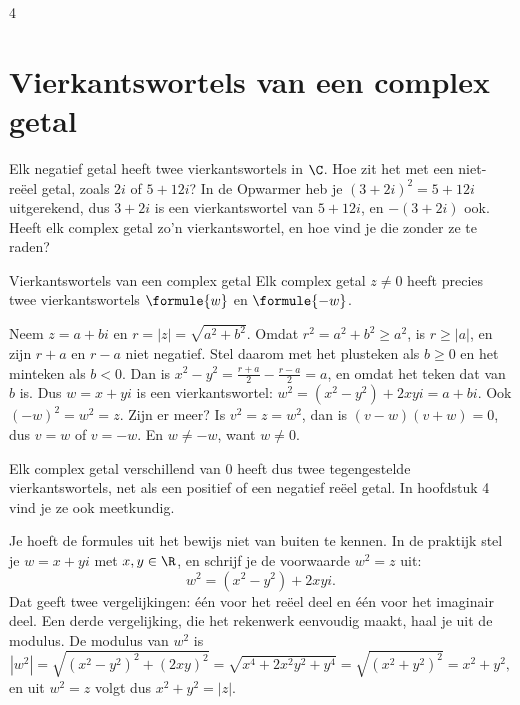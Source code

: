 \begin{alleenvoor}{4}
\section{Vierkantswortels van een complex getal}

Elk negatief getal heeft twee vierkantswortels in $\C$. Hoe zit het met een niet-reëel getal, zoals $2i$ of $5 + 12i$? In de Opwarmer heb je $(3 + 2i)^2 = 5 + 12i$ uitgerekend, dus $3 + 2i$ is een vierkantswortel van $5 + 12i$, en $-(3 + 2i)$ ook. Heeft elk complex getal zo'n vierkantswortel, en hoe vind je die zonder ze te raden?

\begin{theorie}
\begin{stelling}{Vierkantswortels van een complex getal}
Elk complex getal $z \neq 0$ heeft precies twee vierkantswortels $\formule{w}$ en $\formule{-w}$.
\end{stelling}

\begin{bewijs}
Neem $z = a + bi$ en $r = |z| = \sqrt{a^2 + b^2}$. Omdat $r^2 = a^2 + b^2 \geqslant a^2$, is $r \geqslant |a|$, en zijn $r + a$ en $r - a$ niet negatief. Stel daarom
met het plusteken als $b \geqslant 0$ en het minteken als $b < 0$. Dan is $x^2 - y^2 = \frac{r + a}{2} - \frac{r - a}{2} = a$, en
omdat het teken dat van $b$ is. Dus $w = x + yi$ is een vierkantswortel: $w^2 = (x^2 - y^2) + 2xyi = a + bi$. Ook $(-w)^2 = w^2 = z$. Zijn er meer? Is $v^2 = z = w^2$, dan is $(v - w)(v + w) = 0$, dus $v = w$ of $v = -w$. En $w \neq -w$, want $w \neq 0$.
\end{bewijs}
\end{theorie}

Elk complex getal verschillend van 0 heeft dus twee tegengestelde vierkantswortels, net als een positief of een negatief reëel getal. In hoofdstuk 4 vind je ze ook meetkundig.

Je hoeft de formules uit het bewijs niet van buiten te kennen. In de praktijk stel je $w = x + yi$ met $x, y \in \R$, en schrijf je de voorwaarde $w^2 = z$ uit:
\[ w^2 = (x^2 - y^2) + 2xyi . \]
Dat geeft twee vergelijkingen: één voor het reëel deel en één voor het imaginair deel. Een derde vergelijking, die het rekenwerk eenvoudig maakt, haal je uit de modulus. De modulus van $w^2$ is
\[ |w^2| = \sqrt{(x^2 - y^2)^2 + (2xy)^2} = \sqrt{x^4 + 2x^2y^2 + y^4} = \sqrt{(x^2 + y^2)^2} = x^2 + y^2 , \]
en uit $w^2 = z$ volgt dus $x^2 + y^2 = |z|$.


\end{alleenvoor}
